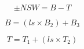 
\begin{equation}
\pm NSW = B - T
\end{equation}

\begin{equation}
B = (ls \times B_2) + B_3
\end{equation}

\begin{equation}
T = T_1 + (ls \times T_2)
\end{equation}

